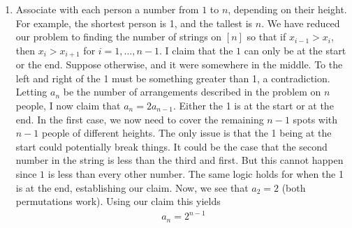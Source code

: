 \documentclass[12pt]{article}
\theoremstyle{definitionstyle}
\begin{document}
\begin{enumerate}[leftmargin=\labelsep]
		\newpage
		\item Associate with each person a number from $1$ to $n$, depending on their height. For example, the shortest person is 1, and the tallest is $n$. We have reduced our problem to finding the number of strings on $[n]$ so that if $x_{i-1} > x_i$, then $x_i > x_{i+1}$ for $i = 1, \ldots, n-1$. I claim that the $1$ can only be at the start or the end. Suppose otherwise, and it were somewhere in the middle. To the left and right of the 1 must be something greater than 1, a contradiction. Letting $a_n$ be the number of arrangements described in the problem on $n$ people, I now claim that $a_n = 2 a_{n-1}$. Either the 1 is at the start or at the end. In the first case, we now need to cover the remaining $n-1$ spots with $n-1$ people of different heights. The only issue is that the 1 being at the start could potentially break things. It could be the case that the second number in the string is less than the third and first. But this cannot happen since $1$ is less than every other number. The same logic holds for when the 1 is at the end, establishing our claim. Now, we see that $a_2 = 2$ (both permutations work). Using our claim this yields 
		\begin{align*}
			\boxed{a_n = 2^{n-1}}
		\end{align*}
	\end{enumerate}
\end{document}
